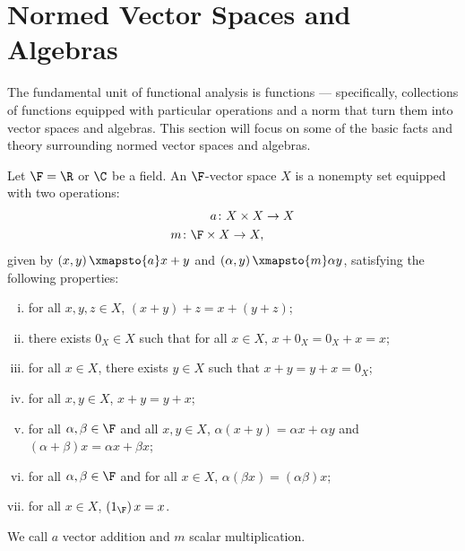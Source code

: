 \section{Normed Vector Spaces and Algebras}%
The fundamental unit of functional analysis is functions --- specifically, collections of functions equipped with particular operations and a norm that turn them into vector spaces and algebras. This section will focus on some of the basic facts and theory surrounding normed vector spaces and algebras.
\begin{definition}\label{def:vector_space_and_algebra}
  Let $\F = \R$ or $\C$ be a field. An $\F$-vector space $X$ is a nonempty set equipped with two operations:
  \begin{align*}
    a\colon X\times X &\rightarrow X\\
    m\colon \F\times X \rightarrow X,
  \end{align*}
  given by $\left(x,y\right) \xmapsto{a} x+y$ and $\left(\alpha,y\right) \xmapsto{m} \alpha y$, satisfying the following properties:
  \begin{enumerate}[(i)]
    \item for all $x,y,z\in X$, $\left(x+y\right)+z = x + \left(y+z\right)$;
    \item there exists $0_X\in X$ such that for all $x\in X$, $x + 0_X = 0_X + x = x$;
    \item for all $x\in X$, there exists $y\in X$ such that $x + y = y + x = 0_X$;
    \item for all $x,y\in X$, $x+ y = y + x$;
    \item for all $\alpha,\beta \in \F$ and all $x,y\in X$, $\alpha\left(x+y\right) = \alpha x + \alpha y$ and $\left(\alpha + \beta\right)x = \alpha x + \beta x$;
    \item for all $\alpha,\beta \in \F$ and for all $x\in X$, $\alpha\left(\beta x\right) = \left(\alpha\beta\right)x$;
    \item for all $x\in X$, $\left(1_{\F}\right)x = x $.
  \end{enumerate}
  We call $a$ vector addition and $m$ scalar multiplication.\newline


\end{definition}
